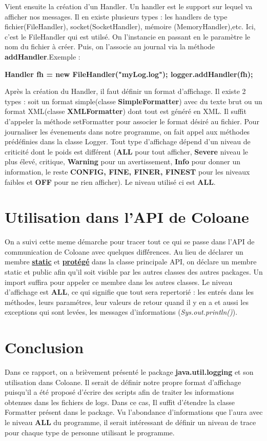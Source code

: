 \documentclass[a4paper,10pt]{report}
\begin{document}
Vient ensuite la cr\'eation d'un Handler. Un handler est le support sur lequel va afficher nos messages. Il en existe plusieurs types : les handlers de type fichier(FileHandler), socket(SocketHandler), m\'emoire (MemoryHandler),etc. Ici, c'est le FileHandler qui est utils\'e. On l'instancie en passant en le param\`etre le nom du fichier à cr\'eer. Puis, on l'associe au journal via la m\'ethode \textbf{addHandler}.Exemple : 
\begin{center}
 \textbf{Handler fh = new FileHandler("myLog.log");
logger.addHandler(fh);}
\end{center}
Apr\`es la cr\'eation du Handler, il faut d\'efinir un format d'affichage. Il existe 2 types : soit un format simple(classe \textbf{SimpleFormatter}) avec du texte brut ou un format XML(classe \textbf{XMLFormatter}) dont tout est g\'en\'er\'e en XML. Il suffit d'appeler la m\'ethode setFormatter pour associer le format d\'esir\'e au fichier.
Pour journaliser les \'evenements dans notre programme, on fait appel aux m\'ethodes pr\'ed\'efinies dans la classe Logger.  Tout type d'affichage d\'epend d'un niveau de criticit\'e dont le poids est diff\'erent (\textbf{ALL} pour tout afficher, \textbf{Severe} niveau le plus \'elev\'e, critique, \textbf{Warning} pour un avertissement, \textbf{Info} pour donner un information, le reste \textbf{CONFIG, FINE, FINER, FINEST} pour les niveaux faibles et \textbf{OFF} pour ne rien afficher). Le niveau utilis\'e ci est \textbf{ALL}.


\section{Utilisation dans l'API de Coloane}
\indent
On a suivi cette meme d\'emarche pour tracer tout ce qui se passe dans l'API de communication de Coloane avec quelques diff\'érences. Au lieu de d\'eclarer un membre \textbf{\underline{static}} et \textbf{\underline{prot\'eg\'e}} dans la classe principale API, on d\'eclare un membre static et public afin qu'il soit visible par les autres classes des autres packages. Un import suffira pour appeler ce membre dans les autres classes. Le niveau d'affichage est \textbf{ALL}, ce qui signifie que tout sera repertori\'e : les entr\'es dans les m\'ethodes, leurs param\'etres, leur valeurs de retour quand il y en a et aussi les exceptions qui sont lev\'ees, les messages d'informations (\textit{Sys.out.println()}).
\\

\section{Conclusion}
\indent
Dans ce rapport, on a bri\`evement pr\'esent\'e le package \textbf{java.util.logging} et son utilisation dans Coloane. Il serait de d\'efinir notre propre format d'affichage puisqu'il a \'et\'e propos\'e d'\'ecrire des scripts afin de traiter les informations obtenues dans les fichiers de logs. Dans ce cas, Il suffit d'\'etendre la classe Formatter pr\'esent dans le package. Vu l'abondance d'informations que l'aura avec le niveau \textbf{ALL} du programme, il serait int\'eressant de d\'efinir un niveau de trace pour chaque type de personne utilisant le programme.
\end{document}
